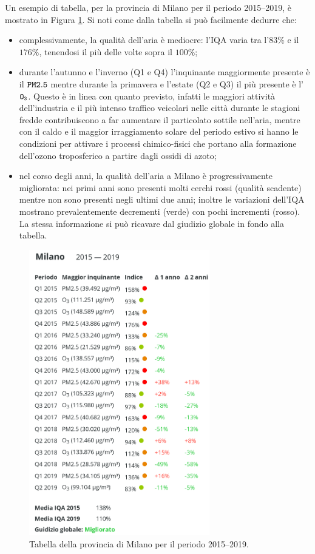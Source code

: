 Un esempio di tabella, per la provincia di Milano per il periodo 2015--2019, è
mostrato in Figura \ref{fig:datatable}. Si noti come dalla tabella si può
facilmente dedurre che:
\begin{itemize}
	\item complessivamente, la qualità dell'aria è mediocre: l'IQA varia tra
		l'\(83\%\) e il \(176\%\), tenendosi il più delle volte sopra il
		\(100\%\);
	\item durante l'autunno e l'inverno (Q1 e Q4) l'inquinante maggiormente
		presente è il \(\mathtt{PM2.5}\) mentre durante la primavera e
		l'estate (Q2 e Q3) il più presente è l'\(\mathtt{O_3}\). Questo è
		in linea con quanto previsto, infatti le maggiori attività
		dell'industria e il più intenso traffico veicolari nelle città
		durante le stagioni fredde contribuiscono a far aumentare il
		particolato sottile nell'aria, mentre con il caldo e il maggior
		irraggiamento solare del periodo estivo si hanno le condizioni
		per attivare i processi chimico-fisici che portano alla
		formazione dell'ozono troposferico a partire dagli ossidi di
		azoto;
	\item nel corso degli anni, la qualità dell'aria a Milano è
		progressivamente migliorata: nei primi anni sono presenti molti
		cerchi rossi (qualità scadente) mentre non sono presenti negli
		ultimi due anni; inoltre le variazioni dell'IQA mostrano
		prevalentemente decrementi (verde) con pochi incrementi (rosso).
		La stessa informazione si può ricavare dal giudizio globale in
		fondo alla tabella.
\end{itemize}

\begin{figure}[htp]
	\centering
	\includegraphics[width=0.7\textwidth]{img/datatable}
	\caption{Tabella della provincia di Milano per il periodo
	2015--2019.}\label{fig:datatable}
\end{figure}

